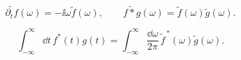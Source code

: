 
\begin{equation}
\boxed{
\widetilde{\partial_t f}(\omega)=-\ii\omega\widetilde f(\omega),
\qquad
\widetilde{f*g}(\omega)=\widetilde f(\omega)\widetilde g(\omega).}
\label{eq:fourier-derivative-convolution-dp21}
\end{equation}

\begin{equation}
\boxed{
\int_{-\infty}^{\infty}\dd t\,f^*(t)g(t)
=\int_{-\infty}^{\infty}\frac{\dd\omega}{2\pi}\,
\widetilde f^{\,*}(\omega)\widetilde g(\omega).}
\label{eq:parseval-time-dp21}
\end{equation}

